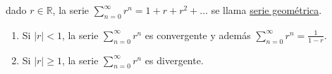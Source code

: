 \documentclass{article}
\theoremstyle{definition}
\theoremstyle{definition}
\theoremstyle{remark}
\begin{document}
\begin{defi}
  dado $r \in \mathbb{R}$, la serie $\sum_{n=0}^{\infty}r^n=1+r+r^2+\dots $ se llama \underline{serie geométrica}.
\end{defi}

\pagebreak
\begin{teo}
  \begin{enumerate} \; \\
    \item Si $|r|<1$, la serie $\sum_{n=0}^{\infty}{r^n}$ es convergente y además $\sum_{n=0}^{\infty}{r^n} = \frac{1}{1-r}$.
     \item Si $|r| \geq 1$, la serie $\sum_{n=0}^{\infty}{r^n}$
      es divergente.
    \end{enumerate}
\end{teo}
\end{document}
